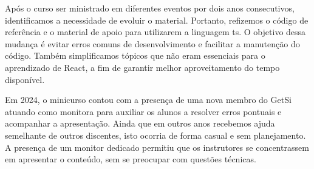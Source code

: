 Após o curso ser ministrado em diferentes eventos por dois anos consecutivos, identificamos a necessidade de evoluir o material.
Portanto, refizemos o código de referência e o material de apoio para utilizarem a linguagem \gls{ts}.
O objetivo dessa mudança é evitar erros comuns de desenvolvimento e facilitar a manutenção do código.
Também simplificamos tópicos que não eram essenciais para o aprendizado de React, a fim de garantir melhor aproveitamento do tempo disponível.

Em 2024, o minicurso contou com a presença de uma nova membro do GetSi atuando como monitora para auxiliar os alunos a resolver erros pontuais e acompanhar a apresentação.
Ainda que em outros anos recebemos ajuda semelhante de outros discentes, isto ocorria de forma casual e sem planejamento.
A presença de um monitor dedicado permitiu que os instrutores se concentrassem em apresentar o conteúdo, sem se preocupar com questões técnicas.
